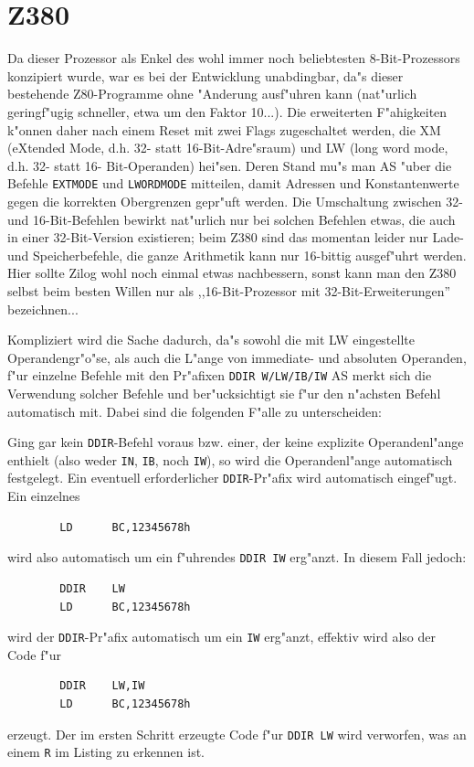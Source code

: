 \documentclass[12pt,a4paper,twoside]{report}
\newcommand{\tty}[1]{{\tt #1}}
\newcommand{\asname}{AS}
\begin{document}

\section{Z380}

Da dieser Prozessor als Enkel des wohl immer noch beliebtesten
8-Bit-Prozessors konzipiert wurde, war es bei der Entwicklung
unabdingbar, da"s dieser bestehende Z80-Programme ohne "Anderung
ausf"uhren kann (nat"urlich geringf"ugig schneller, etwa um den
Faktor 10...).  Die erweiterten F"ahigkeiten k"onnen daher nach
einem Reset mit zwei Flags zugeschaltet werden, die XM (eXtended
Mode, d.h. 32- statt 16-Bit-Adre"sraum) und LW (long word mode,
d.h. 32- statt 16- Bit-Operanden) hei"sen.  Deren Stand mu"s man
\asname{} "uber die Befehle \tty{EXTMODE} und \tty{LWORDMODE} mitteilen, damit
Adressen und Konstantenwerte gegen die korrekten Obergrenzen
gepr"uft werden.  Die Umschaltung zwischen 32- und 16-Bit-Befehlen
bewirkt nat"urlich nur bei solchen Befehlen etwas, die auch in
einer 32-Bit-Version existieren; beim Z380 sind das momentan
leider nur Lade- und Speicherbefehle, die ganze Arithmetik kann
nur 16-bittig ausgef"uhrt werden.  Hier sollte Zilog wohl noch
einmal etwas nachbessern, sonst kann man den Z380 selbst beim
besten Willen nur als ,,16-Bit-Prozessor mit 32-Bit-Erweiterungen''
bezeichnen...

Kompliziert wird die Sache dadurch, da"s sowohl die mit LW eingestellte
Operandengr"o"se, als auch die L"ange von immediate- und absoluten
Operanden, f"ur einzelne Befehle mit den Pr"afixen \tty{DDIR W/LW/IB/IW}
\asname{} merkt sich die Verwendung solcher Befehle und ber"ucksichtigt
sie f"ur den n"achsten Befehl automatisch mit.  Dabei sind die folgenden
F"alle zu unterscheiden:

Ging gar kein \tty{DDIR}-Befehl voraus bzw. einer, der keine explizite
Operandenl"ange enthielt (also weder \tty{IN}, \tty{IB}, noch \tty{IW}), so wird die
Operandenl"ange automatisch festgelegt.  Ein eventuell erforderlicher
\tty{DDIR}-Pr"afix wird automatisch eingef"ugt.  Ein einzelnes
\begin{verbatim}
        LD      BC,12345678h
\end{verbatim}
wird also automatisch um ein f"uhrendes \tty{DDIR IW} erg"anzt.  In diesem
Fall jedoch:
\begin{verbatim}
        DDIR    LW
        LD      BC,12345678h
\end{verbatim}
wird der \tty{DDIR}-Pr"afix automatisch um ein \tty{IW} erg"anzt,
effektiv wird also der Code f"ur
\begin{verbatim}
        DDIR    LW,IW
        LD      BC,12345678h
\end{verbatim}
erzeugt.  Der im ersten Schritt erzeugte Code f"ur \tty{DDIR LW}
wird verworfen, was an einem \tty{R} im Listing zu erkennen
ist.
\end{document}
